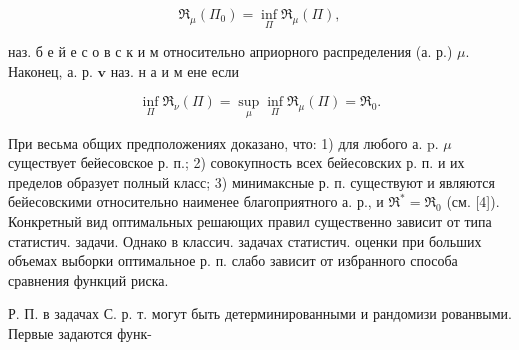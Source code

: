 \documentclass[10pt]{article}
\begin{document}
\[

\mathfrak{R}_{\mu}\left(\Pi_{0}\right)=\inf _{\Pi} \mathfrak{R}_{\mu}(\Pi),

\]



наз. б е й е с о в с к и м относительно априорного распределения (а. р.) $\mu$. Наконец, а. р. $\boldsymbol{v}$ наз. н а и м ене если



\[

\inf _{\Pi} \mathfrak{R}_{\nu}(\Pi)=\sup _{\mu} \inf _{\Pi} \mathfrak{R}_{\mu}(\Pi)=\mathfrak{R}_{0} .

\]



При весьма общих предположениях доказано, что: 1) для любого а. p. $\mu$ существует бейесовское р. п.; 2) совокупность всех бейесовских р. п. и их пределов образует полный класс; 3) минимаксные р. п. существуют и являются бейесовскими относительно наименее благоприятного а. р., и $\mathfrak{R}^{*}=\mathfrak{R}_{0}$ (см. [4]). Конкретный вид оптимальных решающих правил существенно зависит от типа статистич. задачи. Однако в классич. задачах статистич. оценки при больших объемах выборки оптимальное р. п. слабо зависит от избранного способа сравнения функций риска.



Р. П. в задачах С. р. т. могут быть детерминированными и рандомизи рованвыми. Первые задаются функ-
\end{document}
